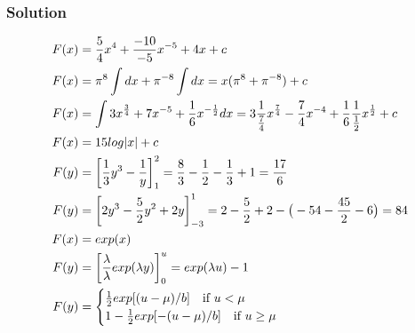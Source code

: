 \documentclass[12pt,a4paper,titlepage]{article}
\begin{document}
\subsubsection*{Solution}
\begin{align*}
F(x)&=\frac{5}{4}x^{4}+\frac{-10}{-5}x^{-5}+4x+c\\
F(x)&=\pi^{8} \int dx + \pi^{-8} \int dx=x(\pi^{8}+\pi^{-8})+c\\
F(x)&=\int 3x^{\frac{3}{4}}+7x^{-5}+\frac{1}{6}x^{-\frac{1}{2}}dx=3\frac{1}{\frac{7}{4}}x^{\frac{7}{4}}-\frac{7}{4}x^{-4}+\frac{1}{6}\frac{1}{\frac{1}{2}}x^{\frac{1}{2}}+c\\
F(x)&=15log|x|+c\\
F(y)&=\bigg[\frac{1}{3}y^{3}-\frac{1}{y}\bigg]_{1}^{2}=\frac{8}{3}-\frac{1}{2}-\frac{1}{3}+1=\frac{17}{6}\\
F(y)&=\bigg[2y^{3}-\frac{5}{2}y^{2}+2y\bigg]_{-3}^{1}=2-\frac{5}{2}+2-\big(-54-\frac{45}{2}-6 \big)=84\\
F(x)&=exp(x)\\
F(y)&=\bigg[\frac{\lambda}{\lambda}exp(\lambda y)\bigg]_{0}^{u}=exp(\lambda u)-1\\
F(y)&=\begin{cases} \frac{1}{2}exp[(u-\mu)/b] \quad \text{if $ u < \mu $} \\ 1-\frac{1}{2}exp[-(u-\mu)/b] \quad \text{if $ u \geq \mu $}  \end{cases}
\end{align*}
%
\end{document}
